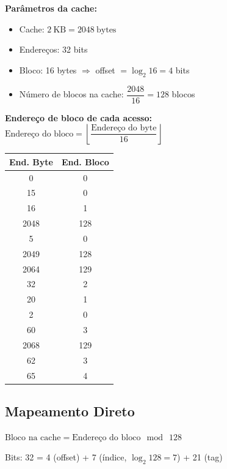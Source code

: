 \documentclass[12pt, a4paper]{article}
\begin{document}
\textbf{Parâmetros da cache:}
\begin{itemize}[noitemsep]
  \item Cache: $2\ \mathrm{KB} = 2048\ \mathrm{bytes}$
  \item Endereços: 32 bits
  \item Bloco: 16 bytes $\Rightarrow$ offset $= \log_2 16 = 4$ bits
  \item Número de blocos na cache: $\dfrac{2048}{16} = 128$ blocos
\end{itemize}

\textbf{Endereço de bloco de cada acesso:}
$\text{Endereço do bloco} = \left\lfloor \dfrac{\text{Endereço do byte}}{16} \right\rfloor$

\vspace{6pt}
\begin{tabular}{cc}
  \toprule
  \textbf{End. Byte} & \textbf{End. Bloco}\\
  \midrule
  0    & 0   \\
  15   & 0   \\
  16   & 1   \\
  2048 & 128 \\
  5    & 0   \\
  2049 & 128 \\
  2064 & 129 \\
  32   & 2   \\
  20   & 1   \\
  2    & 0   \\
  60   & 3   \\
  2068 & 129 \\
  62   & 3   \\
  65   & 4   \\
  \bottomrule
\end{tabular}

\subsection{Mapeamento Direto}

$\text{Bloco na cache} = \text{Endereço do bloco}\ \bmod\ 128$

Bits: 32 = 4 (offset) + 7 (índice, $\log_2 128 = 7$) + 21 (tag)
\end{document}
